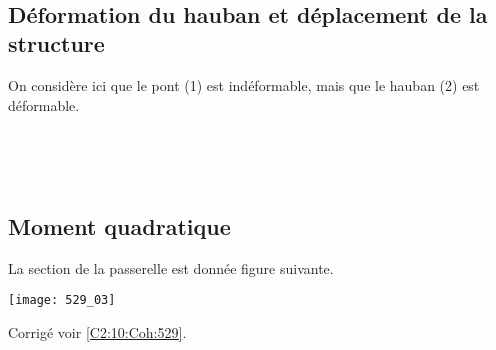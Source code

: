 \ifprof
\begin{corrige}~\\
\end{corrige}
\else
\fi


\subsection*{Déformation du hauban et déplacement de la structure}
On considère ici que le pont (1) est indéformable, mais que le hauban (2) est déformable. 

\ifprof
\begin{corrige}~\\
\end{corrige}
\else
\fi

\ifprof
\begin{corrige}~\\
\end{corrige}
\else
\fi

\subsection*{Moment quadratique}
La section de la passerelle est donnée figure suivante. 
\begin{marginfigure}
\texttt{[image: 529\_03]}

\end{marginfigure}





\ifprof
\else
\begin{flushright}
\footnotesize{Corrigé  voir \ref{C2:10:Coh:529}.}
\end{flushright}%
\fi

